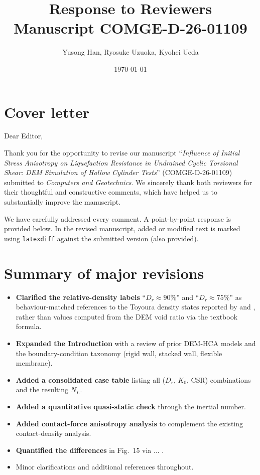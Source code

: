 \documentclass[11pt,a4paper]{article}
\title{Response to Reviewers\\
  \large Manuscript COMGE-D-26-01109}
\author{Yusong Han, Ryosuke Uzuoka, Kyohei Ueda}
\date{\today}
\newcommand{\Kzero}{\ensuremath{K_0}}
\begin{document}
\maketitle

\section*{Cover letter}

Dear Editor,

Thank you for the opportunity to revise our manuscript
``\emph{Influence of Initial Stress Anisotropy on Liquefaction Resistance
in Undrained Cyclic Torsional Shear: DEM Simulation of Hollow Cylinder
Tests}'' (COMGE-D-26-01109) submitted to
\emph{Computers and Geotechnics}. We sincerely thank both reviewers for their
thoughtful and constructive comments, which have helped us to substantially
improve the manuscript.

We have carefully addressed every comment. A point-by-point response is
provided below. In the revised manuscript, added or modified text is marked
using \texttt{latexdiff} against the submitted version (also provided).


\section*{Summary of major revisions}

\begin{itemize}[leftmargin=*]
  \item \textbf{Clarified the relative-density labels}
    ``$D_r \approx 90\%$'' and ``$D_r \approx 75\%$'' as
    behaviour-matched references to the Toyoura density states
    reported by \citet{Nakata1998} and \citet{Ishihara1985}, rather
    than values computed from the DEM void ratio via the textbook
    formula.
  \item \textbf{Expanded the Introduction} with a review of prior DEM-HCA
    models and the boundary-condition taxonomy (rigid wall, stacked wall,
    flexible membrane).
  \item \textbf{Added a consolidated case table} listing all
    ($D_r$, $\Kzero$, CSR) combinations and the resulting $N_L$.
  \item \textbf{Added a quantitative quasi-static check} through the
    inertial number.
  \item \textbf{Added contact-force anisotropy analysis} to complement the
    existing contact-density analysis.
  \item \textbf{Quantified the differences} in Fig.~15 via ... .
  \item Minor clarifications and additional references throughout.
\end{itemize}
\end{document}
